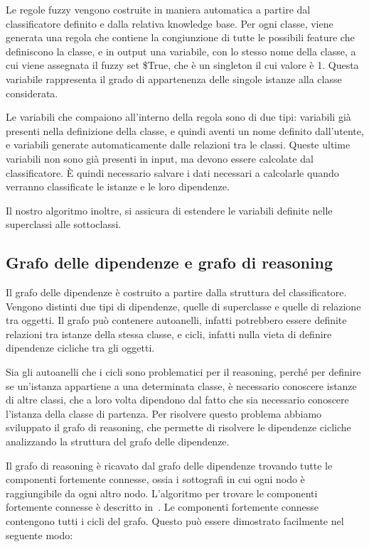 Le regole fuzzy vengono costruite in maniera automatica a partire dal classificatore definito e dalla relativa knowledge base. Per ogni classe, viene generata una regola che contiene la congiunzione di tutte le possibili feature che definiscono la classe, e in output una variabile, con lo stesso nome della classe, a cui viene assegnata il fuzzy set \$True, che è un singleton il cui valore è 1. Questa variabile rappresenta il grado di appartenenza delle singole istanze alla classe considerata.

Le variabili che compaiono all'interno della regola sono di due tipi: variabili già presenti nella definizione della classe, e quindi aventi un nome definito dall'utente, e variabili generate automaticamente dalle relazioni tra le classi. Queste ultime variabili non sono già presenti in input, ma devono essere calcolate dal classificatore. \`E quindi necessario salvare i dati necessari a calcolarle quando verranno classificate le istanze e le loro dipendenze.

Il nostro algoritmo inoltre, si assicura di estendere le variabili definite nelle superclassi alle sottoclassi.

\subsection{Grafo delle dipendenze e grafo di reasoning}

Il grafo delle dipendenze è costruito a partire dalla struttura del classificatore. Vengono distinti due tipi di dipendenze, quelle di superclasse e quelle di relazione tra oggetti. Il grafo può contenere autoanelli, infatti potrebbero essere definite relazioni tra istanze della stessa classe, e cicli, infatti nulla vieta di definire dipendenze cicliche tra gli oggetti.

Sia gli autoanelli che i cicli sono problematici per il reasoning, perché per definire se un'istanza appartiene a una determinata classe, è necessario conoscere istanze di altre classi, che a loro volta dipendono dal fatto che sia necessario conoscere l'istanza della classe di partenza. Per risolvere questo problema abbiamo sviluppato il grafo di reasoning, che permette di risolvere le dipendenze cicliche analizzando la struttura del grafo delle dipendenze.

Il grafo di reasoning è ricavato dal grafo delle dipendenze trovando tutte le componenti fortemente connesse, ossia i sottografi in cui ogni nodo è raggiungibile da ogni altro nodo. L'algoritmo per trovare le componenti fortemente connesse è descritto in~\cite{Tarjan72depthfirst}.
Le componenti fortemente connesse contengono tutti i cicli del grafo. Questo può essere dimostrato facilmente nel seguente modo:

